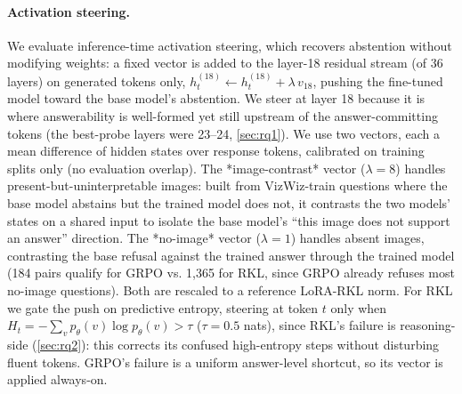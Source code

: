 \documentclass[10pt,twocolumn,letterpaper]{article}
\begin{document}
\paragraph{Activation steering.}
We evaluate inference-time activation steering, which recovers abstention without modifying weights: a fixed vector is added to the layer-18 residual stream (of 36 layers) on generated tokens only, $h^{(18)}_t \leftarrow h^{(18)}_t + \lambda\, v_{18}$, pushing the fine-tuned model toward the base model’s abstention. We steer at layer 18 because it is where answerability is well-formed yet still upstream of the answer-committing tokens (the best-probe layers were 23–24, \cref{sec:rq1}). We use two vectors, each a mean difference of hidden states over response tokens, calibrated on training splits only (no evaluation overlap). The *image-contrast* vector ($\lambda{=}8$) handles present-but-uninterpretable images: built from VizWiz-train questions where the base model abstains but the trained model does not, it contrasts the two models’ states on a shared input to isolate the base model’s “this image does not support an answer” direction. The *no-image* vector ($\lambda{=}1$) handles absent images, contrasting the base refusal against the trained answer through the trained model (184 pairs qualify for GRPO vs. 1{,}365 for RKL, since GRPO already refuses most no-image questions). Both are rescaled to a reference LoRA-RKL norm. For RKL we gate the push on predictive entropy, steering at token $t$ only when $H_t = -\sum_v p_\theta(v)\log p_\theta(v) > \tau$ ($\tau{=}0.5$ nats), since RKL’s failure is reasoning-side (\cref{sec:rq2}): this corrects its confused high-entropy steps without disturbing fluent tokens. GRPO’s failure is a uniform answer-level shortcut, so its vector is applied always-on.
\end{document}
